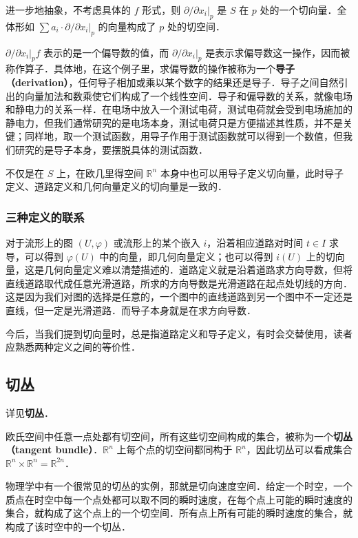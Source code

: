 进一步地抽象，不考虑具体的 $f$ 形式，则 $\partial/\partial x_i|_{p}$ 是 $S$ 在 $p$ 处的一个切向量．全体形如 $\sum a_i\cdot\partial/\partial x_i|_{p}$ 的向量构成了 $p$ 处的切空间．

$\partial/\partial x_i|_{p}f$ 表示的是一个偏导数的值，而 $\partial/\partial x_i|_{p}$ 是表示求偏导数这一操作，因而被称作算子．具体地，在这个例子里，求偏导数的操作被称为一个\textbf{导子（derivation）}，任何导子相加或乘以某个数字的结果还是导子．导子之间自然引出的向量加法和数乘使它们构成了一个线性空间．导子和偏导数的关系，就像电场和静电力的关系一样．在电场中放入一个测试电荷，测试电荷就会受到电场施加的静电力，但我们通常研究的是电场本身，测试电荷只是方便描述其性质，并不是关键；同样地，取一个测试函数，用导子作用于测试函数就可以得到一个数值，但我们研究的是导子本身，要摆脱具体的测试函数．

不仅是在 $S$ 上，在欧几里得空间 $\mathbb{R}^n$ 本身中也可以用导子定义切向量，此时导子定义、道路定义和几何向量定义的切向量是一致的．

\subsubsection{三种定义的联系}

对于流形上的图 $(U,\varphi)$ 或流形上的某个嵌入 $i$，沿着相应道路对时间 $t\in I$ 求导，可以得到 $\varphi(U)$ 中的向量，即几何向量定义；也可以得到 $i(U)$ 上的切向量，这是几何向量定义难以清楚描述的．道路定义就是沿着道路求方向导数，但将直线道路取代成任意光滑道路，所求的方向导数是光滑道路在起点处切线的方向．这是因为我们对图的选择是任意的，一个图中的直线道路到另一个图中不一定还是直线，但一定是光滑道路．而导子本身就是在求方向导数．

今后，当我们提到切向量时，总是指道路定义和导子定义，有时会交替使用，读者应熟悉两种定义之间的等价性．

\subsection{切丛}
详见\textbf{切丛}．

欧氏空间中任意一点处都有切空间，所有这些切空间构成的集合，被称为一个\textbf{切丛（tangent bundle）}．$\mathbb{R}^n$ 上每个点的切空间都同构于 $\mathbb{R}^n$，因此切丛可以看成集合 $\mathbb{R}^n\times\mathbb{R}^n=\mathbb{R}^{2n}$．

物理学中有一个很常见的切丛的实例，那就是切向速度空间．给定一个时空，一个质点在时空中每一个点处都可以取不同的瞬时速度，在每个点上可能的瞬时速度的集合，就构成了这个点上的一个切空间．所有点上所有可能的瞬时速度的集合，就构成了该时空中的一个切丛．









